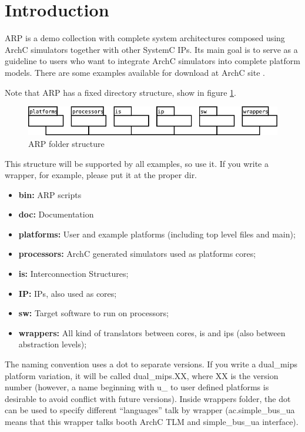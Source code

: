\documentclass[12pt]{article}
\begin{document}
\Topmatter

\section{Introduction}
ARP is a demo collection with complete system architectures composed using ArchC simulators together with other SystemC\cite{OSCI} IPs. Its main goal is
to serve as a guideline to users who want to integrate ArchC simulators into complete platform models. There are some examples available for download at ArchC site \cite{ARCHC}.

Note that ARP has a fixed directory structure, show in figure \ref{dual:arp}.

\begin{figure}[ht]
\centering
\includegraphics[scale=0.5]{diag_estrutura.png}
\caption{ARP folder structure}
\label{dual:arp}
\end{figure}

This structure will be supported by all examples, so use it. If you
write a wrapper, for example, please put it at the proper dir.
\begin{itemize}
\item \textbf{bin:} ARP scripts
\item \textbf{doc:} Documentation
\item \textbf{platforms:} User and example platforms (including
 top level files and main);
\item \textbf{processors:} ArchC generated simulators used as 
platforms cores;
\item \textbf{is:} Interconnection Structures;
\item \textbf{IP:} IPs, also used as cores;
\item \textbf{sw:} Target software to run on processors;
\item \textbf{wrappers:} All kind of translators between cores, is and 
ips (also between abstraction levels);
\end{itemize}

The naming convention uses a dot to separate versions. If you write a
dual\_mips platform variation, it will be called dual\_mips.XX, where
XX is the version number (however, a name beginning with u\_ to user
defined platforms is desirable to avoid conflict with future
versions). Inside wrappers folder, the dot can be used to specify
different ``languages'' talk by wrapper (ac.simple\_bus\_ua means that
this wrapper talks booth ArchC TLM and simple\_bus\_ua interface).
\end{document}
